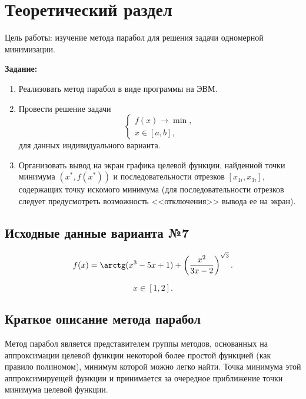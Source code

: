 \chapter{Теоретический раздел}

Цель работы: изучение метода парабол для решения задачи одномерной минимизации.

\textbf{Задание:}
\begin{enumerate}
	\item Реализовать метод парабол в виде программы на ЭВМ.
	\item Провести решение задачи 
	\begin{equation*}
		\begin{cases}
			f(x) \rightarrow \min, \\
			x \in [a, b],
		\end{cases}
	\end{equation*}
	для данных индивидуального варианта.
	\item Организовать вывод на экран графика целевой функции, найденной точки минимума $(x^{*}, f(x^{*}))$ и последовательности отрезков $[x_{1i}, x_{3i}]$, содержащих точку искомого минимума (для последовательности отрезков следует предусмотреть возможность <<отключения>> вывода ее на экран).
\end{enumerate}

\section{Исходные данные варианта №7}

\begin{equation*}
	f(x) = \arctg(x^3 - 5x + 1) + \left( \frac{x^2}{3x - 2} \right)^{\sqrt{3}}.
\end{equation*}

\begin{equation*}
	x \in [1, 2].
\end{equation*}

\section{Краткое описание метода парабол}

Метод парабол является представителем группы методов, основанных на аппроксимации целевой функции некоторой более простой функцией (как правило полиномом), минимум которой можно легко найти. Точка минимума этой аппроксимируещей функции и принимается за очередное приближение точки минимума целевой функции.


